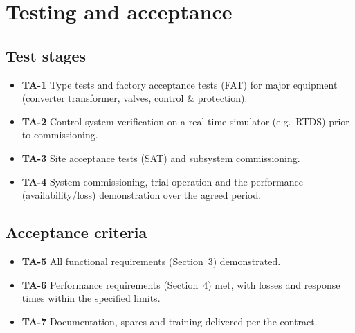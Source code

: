 \section{Testing and acceptance}

\subsection{Test stages}
\begin{itemize}\setlength{\itemsep}{0.2em}
  \item \textbf{TA-1} Type tests and factory acceptance tests (FAT) for major
        equipment (converter transformer, valves, control \& protection).
  \item \textbf{TA-2} Control-system verification on a real-time simulator
        (e.g.\ RTDS) prior to commissioning.
  \item \textbf{TA-3} Site acceptance tests (SAT) and subsystem commissioning.
  \item \textbf{TA-4} System commissioning, trial operation and the performance
        (availability/loss) demonstration over the agreed period.
\end{itemize}

\subsection{Acceptance criteria}
\begin{itemize}\setlength{\itemsep}{0.2em}
  \item \textbf{TA-5} All functional requirements (Section~3) demonstrated.
  \item \textbf{TA-6} Performance requirements (Section~4) met, with losses and
        response times within the specified limits.
  \item \textbf{TA-7} Documentation, spares and training delivered per the
        contract.
\end{itemize}
